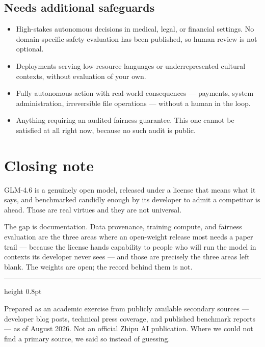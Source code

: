 \documentclass[11pt,a4paper]{article}
\begin{document}
\subsection*{Needs additional safeguards}
\begin{itemize}
  \item High-stakes autonomous decisions in medical, legal, or financial settings. No
        domain-specific safety evaluation has been published, so human review is not optional.
  \item Deployments serving low-resource languages or underrepresented cultural contexts, without
        evaluation of your own.
  \item Fully autonomous action with real-world consequences --- payments, system administration,
        irreversible file operations --- without a human in the loop.
  \item Anything requiring an audited fairness guarantee. This one cannot be satisfied at all
        right now, because no such audit is public.
\end{itemize}

\section*{Closing note}

GLM-4.6 is a genuinely open model, released under a license that means what it says, and
benchmarked candidly enough by its developer to admit a competitor is ahead. Those are real
virtues and they are not universal.

The gap is documentation. Data provenance, training compute, and fairness evaluation are the
three areas where an open-weight release most needs a paper trail --- because the license hands
capability to people who will run the model in contexts its developer never sees --- and those
are precisely the three areas left blank. The weights are open; the record behind them is not.

\vspace{10pt}
{\color{rule}\hrule height 0.8pt}
\vspace{6pt}

{\footnotesize\color{muted}
Prepared as an academic exercise from publicly available secondary sources --- developer blog
posts, technical press coverage, and published benchmark reports --- as of August 2026. Not an
official Zhipu AI publication. Where we could not find a primary source, we said so instead of
guessing.}
\end{document}
